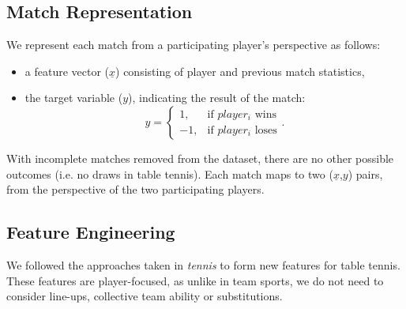 
\subsection{Match Representation}
We represent each match from a participating player's perspective as follows:
\begin{itemize}
    \item a feature vector ($\underline{x}$) consisting of player and previous match statistics,
    \item{
     the target variable ($y$), indicating the result of the match: %
     \begin{equation}
        y =
        \begin{cases}
        1, &\text{if $player_i$ wins} \\ 
        -1, &\text{if $player_i$ loses}
        \end{cases}.
    \end{equation}
     }
\end{itemize}



With incomplete matches removed from the dataset, there are no other possible outcomes (i.e. no draws in table tennis). Each match maps to two ($\underline{x}$,$y$) pairs, from the perspective of the two participating players.

\subsection{Feature Engineering}
\label{sec:engineer}
We followed the approaches taken in \textit{tennis}  \cite{barnett2005combining,sipko2015machine,cornman2017machine}  to form new features for table tennis. These features are player-focused, as unlike in team sports, we do not need to consider line-ups, collective team ability or substitutions.

